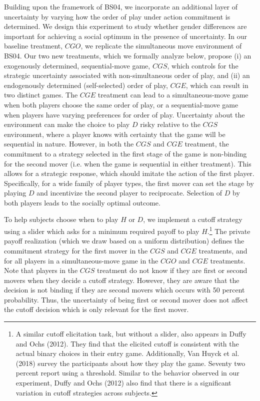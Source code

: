 \documentclass[11pt,english]{article}
\begin{document}
Building upon the framework of BS04, we incorporate an additional layer of uncertainty by varying how the order of play under action commitment is determined. We design this experiment to study whether gender differences are important for achieving a social optimum in the presence of uncertainty. In our baseline treatment, $CGO$, we replicate the simultaneous move environment of BS04. Our two new treatments, which we formally analyze below, propose (i) an exogenously determined, sequential-move game, $CGS$, which controls for the strategic uncertainty associated with non-simultaneous order of play, and (ii) an endogenously determined (self-selected) order of play, $CGE$, which can result in two distinct games. The $CGE$ treatment can lead to a simultaneous-move game when both players choose the same order of play, or a sequential-move game when players have varying preferences for order of play. Uncertainty about the environment can make the choice to play $D$ risky relative to the $CGS$ environment, where a player knows with certainty that the game will be sequential in nature. However, in both the $CGS$ and $CGE$ treatment, the commitment to a strategy selected in the first stage of the game is non-binding for the second mover (i.e. when the game is sequential in either treatment). This allows for a strategic response, which should imitate the action of the first player. Specifically, for a wide family of player types, the first mover can set the stage by playing $D$ and incentivize the second player to reciprocate. Selection of $D$ by both players leads to the socially optimal outcome.

To help subjects choose when to play $H$ or $D$, we implement a cutoff strategy using a slider which asks for a minimum required payoff to play $H$.\footnote{A similar cutoff elicitation task, but without a slider, also appears in Duffy and Ochs (2012). They find that the elicited cutoff is consistent with the actual binary choices in their entry game. Additionally, Van Huyck et al. (2018) survey the participants about how they play the game. Seventy two percent report using a threshold. Similar to the behavior observed in our experiment, Duffy and Ochs (2012) also find that there is a significant variation in cutoff strategies across subjects.} The private payoff realization (which we draw based on a uniform distribution) defines the commitment strategy for the first mover in the $CGS$ and $CGE$ treatments, and for all players in a simultaneous-move game in the $CGO$ and $CGE$ treatments. Note that players in the $CGS$ treatment do not know if they are first or second movers when they decide a cutoff strategy. However, they are aware that the decision is not binding if they are second movers which occurs with 50 percent probability. Thus, the uncertainty of being first or second mover does not affect the cutoff decision which is only relevant for the first mover.
\end{document}
